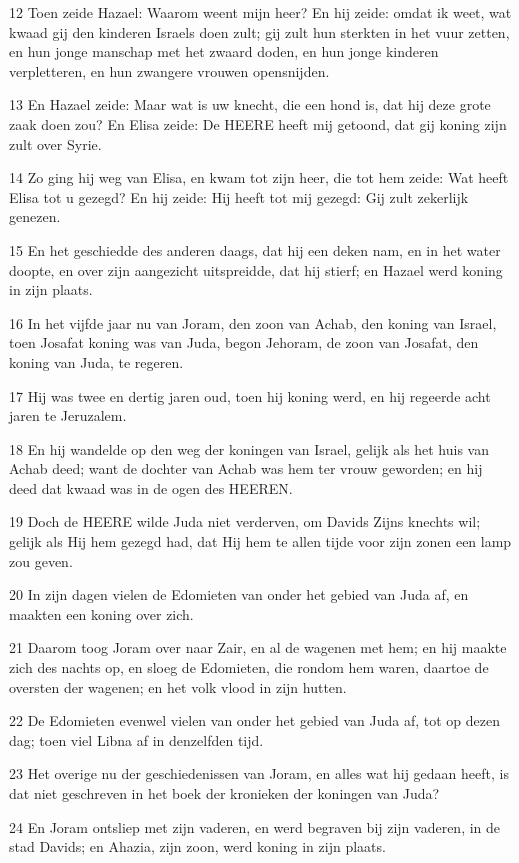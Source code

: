 \par 12 Toen zeide Hazael: Waarom weent mijn heer? En hij zeide: omdat ik weet, wat kwaad gij den kinderen Israels doen zult; gij zult hun sterkten in het vuur zetten, en hun jonge manschap met het zwaard doden, en hun jonge kinderen verpletteren, en hun zwangere vrouwen opensnijden.
\par 13 En Hazael zeide: Maar wat is uw knecht, die een hond is, dat hij deze grote zaak doen zou? En Elisa zeide: De HEERE heeft mij getoond, dat gij koning zijn zult over Syrie.
\par 14 Zo ging hij weg van Elisa, en kwam tot zijn heer, die tot hem zeide: Wat heeft Elisa tot u gezegd? En hij zeide: Hij heeft tot mij gezegd: Gij zult zekerlijk genezen.
\par 15 En het geschiedde des anderen daags, dat hij een deken nam, en in het water doopte, en over zijn aangezicht uitspreidde, dat hij stierf; en Hazael werd koning in zijn plaats.
\par 16 In het vijfde jaar nu van Joram, den zoon van Achab, den koning van Israel, toen Josafat koning was van Juda, begon Jehoram, de zoon van Josafat, den koning van Juda, te regeren.
\par 17 Hij was twee en dertig jaren oud, toen hij koning werd, en hij regeerde acht jaren te Jeruzalem.
\par 18 En hij wandelde op den weg der koningen van Israel, gelijk als het huis van Achab deed; want de dochter van Achab was hem ter vrouw geworden; en hij deed dat kwaad was in de ogen des HEEREN.
\par 19 Doch de HEERE wilde Juda niet verderven, om Davids Zijns knechts wil; gelijk als Hij hem gezegd had, dat Hij hem te allen tijde voor zijn zonen een lamp zou geven.
\par 20 In zijn dagen vielen de Edomieten van onder het gebied van Juda af, en maakten een koning over zich.
\par 21 Daarom toog Joram over naar Zair, en al de wagenen met hem; en hij maakte zich des nachts op, en sloeg de Edomieten, die rondom hem waren, daartoe de oversten der wagenen; en het volk vlood in zijn hutten.
\par 22 De Edomieten evenwel vielen van onder het gebied van Juda af, tot op dezen dag; toen viel Libna af in denzelfden tijd.
\par 23 Het overige nu der geschiedenissen van Joram, en alles wat hij gedaan heeft, is dat niet geschreven in het boek der kronieken der koningen van Juda?
\par 24 En Joram ontsliep met zijn vaderen, en werd begraven bij zijn vaderen, in de stad Davids; en Ahazia, zijn zoon, werd koning in zijn plaats.
